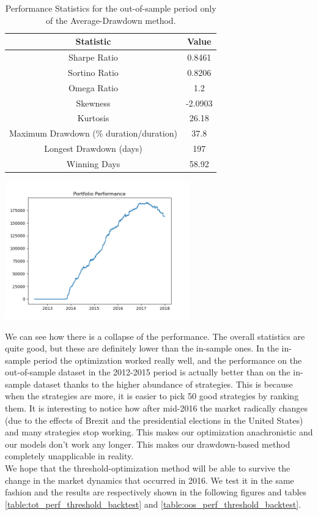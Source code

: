 \begin{table}
	\centering
	\begin{tabular}{c|c}
		\textbf{Statistic} & \textbf{Value} \\\hline
		Sharpe Ratio & 0.8461 \\ 
		Sortino Ratio & 0.8206 \\ 
		Omega Ratio & 1.2 \\ 
		Skewness & -2.0903 \\ 
		Kurtosis & 26.18 \\ 
		Maximum Drawdown (\% duration/duration) & 37.8 \\ 
		Longest Drawdown (days) & 197 \\ 
		Winning Days & 58.92 \\ 
	\end{tabular}
	\label{table:oos_perf_av_drawdown}
	\caption{\label{table:oos_perf_av_drawdown} Performance Statistics for the out-of-sample period only of the Average-Drawdown method.}
\end{table}

\begin{center}
	\centering
	\includegraphics[width=0.6\textwidth]{GridSearches/Average_Drawdown/OOs_PnL_Line.png}
	\label{Average_Drawdown_OOS}
\end{center}

We can see how there is a collapse of the performance. The overall statistics are quite good, but these are definitely lower than the in-sample ones. In the in-sample period the optimization worked really well, and the performance on the out-of-sample dataset in the 2012-2015 period is actually better than on the in-sample dataset thanks to the higher abundance of strategies. This is because when the strategies are more, it is easier to pick 50 good strategies by ranking them. It is interesting to notice how after mid-2016 the market radically changes (due to the effects of Brexit and the presidential elections in the United States) and many strategies stop working. This makes our optimization anachronistic and our models don't work any longer. This makes our drawdown-based method completely unapplicable in reality.\\
We hope that the threshold-optimization method will be able to survive the change in the market dynamics that occurred in 2016. We test it in the same fashion and the results are respectively shown in the following figures and tables \ref{table:tot_perf_threshold_backtest} and \ref{table:oos_perf_threshold_backtest}.

